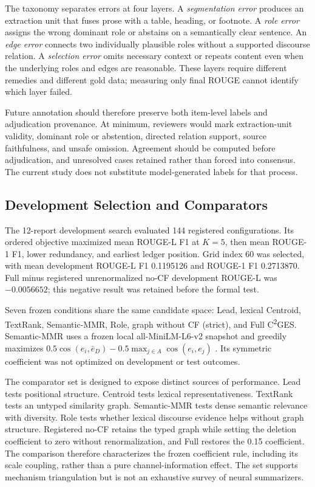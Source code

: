 \documentclass[applsci,article,submit,moreauthors]{Definitions/mdpi}
\newcommand{\cges}{C\textsuperscript{2}GES}
\begin{document}
The taxonomy separates errors at four layers. A \textit{segmentation error} produces an extraction unit that fuses prose with a table, heading, or footnote. A \textit{role error} assigns the wrong dominant role or abstains on a semantically clear sentence. An \textit{edge error} connects two individually plausible roles without a supported discourse relation. A \textit{selection error} omits necessary context or repeats content even when the underlying roles and edges are reasonable. These layers require different remedies and different gold data; measuring only final ROUGE cannot identify which layer failed.

Future annotation should therefore preserve both item-level labels and adjudication provenance. At minimum, reviewers would mark extraction-unit validity, dominant role or abstention, directed relation support, source faithfulness, and unsafe omission. Agreement should be computed before adjudication, and unresolved cases retained rather than forced into consensus. The current study does not substitute model-generated labels for that process.

\subsection{Development Selection and Comparators}

The 12-report development search evaluated 144 registered configurations. Its ordered objective maximized mean ROUGE-L F1 at $K=5$, then mean ROUGE-1 F1, lower redundancy, and earliest ledger position. Grid index 60 was selected, with mean development ROUGE-L F1 0.1195126 and ROUGE-1 F1 0.2713870. Full minus registered unrenormalized no-CF development ROUGE-L was $-0.0056652$; this negative result was retained before the formal test.

Seven frozen conditions share the same candidate space: Lead, lexical Centroid, TextRank, Semantic-MMR, Role, graph without CF (strict), and Full \cges{}. Semantic-MMR uses a frozen local all-MiniLM-L6-v2 snapshot and greedily maximizes $0.5\cos(e_i,\bar e_D)-0.5\max_{j\in A}\cos(e_i,e_j)$ \cite{reimers2019sentencebert}. Its symmetric coefficient was not optimized on development or test outcomes.

The comparator set is designed to expose distinct sources of performance. Lead tests positional structure. Centroid tests lexical representativeness. TextRank tests an untyped similarity graph. Semantic-MMR tests dense semantic relevance with diversity. Role tests whether lexical discourse evidence helps without graph structure. Registered no-CF retains the typed graph while setting the deletion coefficient to zero without renormalization, and Full restores the 0.15 coefficient. The comparison therefore characterizes the frozen coefficient rule, including its scale coupling, rather than a pure channel-information effect. The set supports mechanism triangulation but is not an exhaustive survey of neural summarizers.
\end{document}
